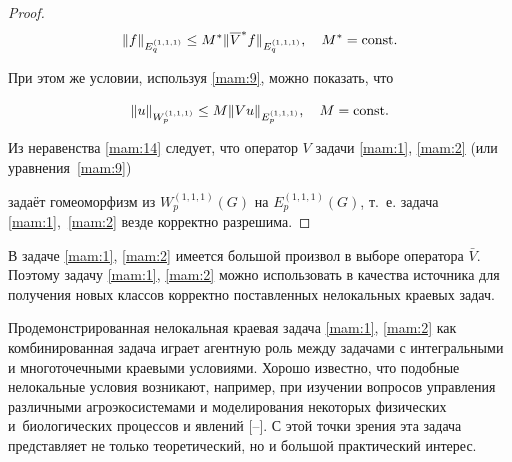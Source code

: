 \begin{proof}
\begin{equation*}
\| f\| _{E_{q}^{(1, 1, 1) }}\leq M^{\ast} \| \overline{V}^{\ast }f\| _{E_{q}^{(1, 1, 1) }},\quad M^{\ast }={\rm const}.

\end{equation*}

При этом же условии, используя \eqref{mam:9}, можно показать, что

\begin{equation}

\label{mam:14}

\| u\|_{W_{p}^{(1, 1, 1) }}\leq M\| Vu\| _{E_{p}^{(1, 1, 1) }},\quad M={\rm const}.

\end{equation}

Из неравенства \eqref{mam:14} следует, что оператор $V$ задачи \eqref{mam:1}, \eqref{mam:2} (или уравнения~\eqref{mam:9})

задаёт гомеоморфизм из $W_{p}^{(1, 1, 1)} (G)$ на $E_{p}^{(1, 1, 1)} (G)$, т.~е. задача \eqref{mam:1},~\eqref{mam:2} везде корректно разрешима. \end{proof}



\smallskip



В задаче  \eqref{mam:1}, \eqref{mam:2} имеется большой произвол в выборе оператора  $\bar{V}$. Поэтому задачу \eqref{mam:1}, \eqref{mam:2} можно использовать в качества источника для получения новых классов корректно поставленных нелокальных краевых задач.



Продемонстрированная  нелокальная краевая задача \eqref{mam:1}, \eqref{mam:2} как комбинированная задача играет агентную   роль между  задачами с интегральными и многоточечными краевыми условиями. Хорошо известно, что подобные нелокальные условия возникают, например, при изучении вопросов управления различными агроэкосистемами и моделирования некоторых физических и~биологических процессов и явлений [--]. С этой точки зрения эта задача представляет не только теоретический, но и большой практический интерес.







